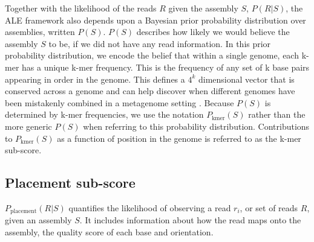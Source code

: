 \documentclass[phd,tocprelim]{cornell}
\begin{document}
Together with the likelihood of the reads $R$ given the assembly $S$, $P(R|S)$, the ALE framework also depends upon a Bayesian prior probability distribution over assemblies, written $P(S)$.  $P(S)$ describes how likely we would believe the assembly $S$ to be, if we did not have any read information.  In this prior probability distribution, we encode the belief that within a single genome, each k-mer has a unique k-mer frequency. This is the frequency of any set of k base pairs appearing in order in the genome. This defines a $4^{k}$ dimensional vector that is conserved across a genome and can help discover when different genomes have been mistakenly combined in a metagenome setting \cite{Teeling2004} \cite{Woyke2006}. Because $P(S)$ is determined by k-mer frequencies, we use the notation $P_{\text{kmer}}(S)$ rather than the more generic $P(S)$ when referring to this probability distribution. Contributions to $P_{\text{kmer}}(S)$ as a function of position in the genome is referred to as the k-mer sub-score.

\subsection{Placement sub-score} %
\label{sub:Placement sub-score}

$P_{\text{placement}}(R|S)$ quantifies the likelihood of observing a read $r_{i}$, or set of reads $R$, given an assembly $S$. It includes information about how the read maps onto the assembly, the quality score of each base and orientation.
\end{document}
